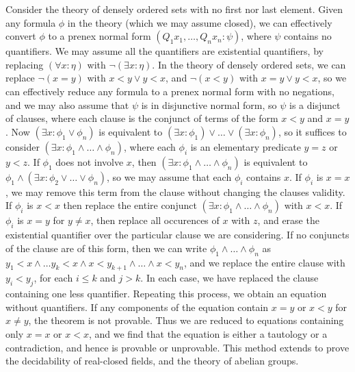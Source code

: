 \begin{example}
    Consider the theory of densely ordered sets with no first nor last element. Given any formula $\phi$ in the theory (which we may assume closed), we can effectively convert $\phi$ to a prenex normal form $(Q_1 x_1, \dots, Q_n x_n: \psi)$, where $\psi$ contains no quantifiers. We may assume all the quantifiers are existential quantifiers, by replacing $(\forall x: \eta)$ with $\neg (\exists x: \eta)$. In the theory of densely ordered sets, we can replace $\neg (x = y)$ with $x < y \vee y < x$, and $\neg (x < y)$ with $x = y \vee y < x$, so we can effectively reduce any formula to a prenex normal form with no negations, and we may also assume that $\psi$ is in disjunctive normal form, so $\psi$ is a disjunct of clauses, where each clause is the conjunct of terms of the form $x < y$ and $x = y$. Now $(\exists x: \phi_1 \vee \phi_n)$ is equivalent to $(\exists x: \phi_1) \vee \dots \vee (\exists x: \phi_n)$, so it suffices to consider $(\exists x: \phi_1 \wedge \dots \wedge \phi_n)$, where each $\phi_i$ is an elementary predicate $y = z$ or $y < z$. If $\phi_1$ does not involve $x$, then $(\exists x: \phi_1 \wedge \dots \wedge \phi_n)$ is equivalent to $\phi_1 \wedge (\exists x: \phi_2 \vee \dots \vee \phi_n)$, so we may assume that each $\phi_i$ contains $x$. If $\phi_i$ is $x = x$, we may remove this term from the clause without changing the clauses validity. If $\phi_i$ is $x < x$ then replace the entire conjunct $(\exists x: \phi_1 \wedge \dots \wedge \phi_n)$ with $x < x$. If $\phi_i$ is $x = y$ for $y \neq x$, then replace all occurences of $x$ with $z$, and erase the existential quantifier over the particular clause we are considering. If no conjuncts of the clause are of this form, then we can write $\phi_1 \wedge \dots \wedge \phi_n$ as $y_1 < x \wedge \dots y_k < x \wedge x < y_{k+1} \wedge \dots \wedge x < y_n$, and we replace the entire clause with $y_i < y_j$, for each $i \leq k$ and $j > k$. In each case, we have replaced the clause containing one less quantifier. Repeating this process, we obtain an equation without quantifiers. If any components of the equation contain $x = y$ or $x < y$ for $x \neq y$, the theorem is not provable. Thus we are reduced to equations containing only $x = x$ or $x < x$, and we find that the equation is either a tautology or a contradiction, and hence is provable or unprovable. This method extends to prove the decidability of real-closed fields, and the theory of abelian groups.
\end{example}




